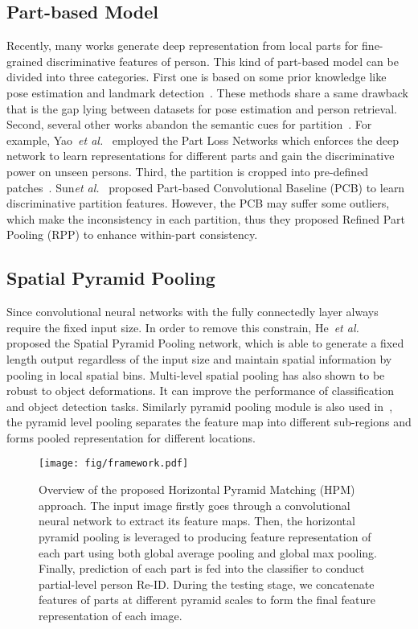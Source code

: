 \documentclass[letterpaper]{article} \usepackage{aaai19}  \usepackage{times}  \usepackage{helvet}  \usepackage{courier}  \usepackage{url}  \usepackage{graphicx}  \frenchspacing  \setlength{\pdfpagewidth}{8.5in}  \setlength{\pdfpageheight}{11in}  \usepackage{multirow}
\newcommand{\etal}{\emph{et al.}}
\begin{document}
\subsection{Part-based Model}
Recently, many works generate deep representation from local parts for fine-grained discriminative features of person. This kind of part-based model can be divided into three categories. First one is based on some prior knowledge like pose estimation and landmark detection~\cite{zheng2017pose,su2017pose,wei2017glad}. These methods share a same drawback that is the gap lying between datasets for pose estimation and person retrieval. Second, several other works abandon the semantic cues for partition~\cite{yao2017deep,liu2017hydraplus,Zhao2017DeeplyLearnedPR,li2018harmonious}. For example,  Yao~\etal~\cite{yao2017deep} employed the Part Loss Networks which enforces the deep network to learn representations for different parts and gain the discriminative power on unseen persons. Third, the partition is cropped into pre-defined patches~\cite{sun2017beyond,li2017learning}. Sun\etal~\cite{sun2017beyond} proposed Part-based Convolutional Baseline (PCB) to learn  discriminative partition features. However, the PCB may suffer some outliers, which make the inconsistency in each partition, thus they proposed Refined Part Pooling (RPP) to enhance within-part consistency.

\subsection{Spatial Pyramid Pooling}
Since convolutional neural networks with the fully connectedly layer always require the fixed input size. In order to remove this constrain, He~\etal~\cite{he2014spatial} proposed the Spatial Pyramid Pooling network, which is able to generate a fixed length output regardless of the input size and maintain spatial information by pooling in local spatial bins. Multi-level spatial pooling has also shown to be robust to object deformations. It can improve the performance of classification and object detection tasks. Similarly pyramid pooling module is also used in~\cite{zhao2017pyramid}, the pyramid level pooling separates the feature map into different sub-regions and forms pooled representation for different locations. 





\begin{figure*}[t]
	\centering
	\texttt{[image: fig/framework.pdf]}
	\caption{Overview of the proposed Horizontal Pyramid Matching (HPM) approach. The input image firstly goes through a convolutional neural network to extract its feature maps. Then, the horizontal pyramid pooling is leveraged to producing feature representation of each part using both global average pooling and global max pooling. Finally, prediction of each part is fed into the classifier to conduct partial-level person Re-ID. During the testing stage, we concatenate features of parts at different pyramid scales to form the final feature representation of each image.}
	\label{fig:framework}
	\vspace{-5mm}
\end{figure*}
\end{document}
